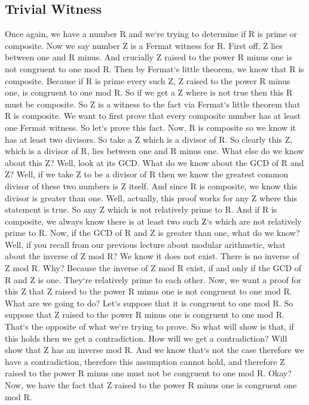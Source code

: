 \subsection{Trivial Witness}
Once again, we have a number R and we`re trying to determine if R is prime or composite.
Now we say number Z is a Fermat witness for R\@.
First off, Z lies between one and R minus.
And crucially Z raised to the power R minus one is not congruent to one mod R\@.
Then by Fermat`s little theorem, we know that R is composite.
Because if R is prime every such Z, Z raised to the power R minus one, is congruent to one mod R\@.
So if we get a Z where is not true then this R must be composite.
So Z is a witness to the fact via Fermat`s little theorem that R is composite.
We want to first prove that every composite number has at least one Fermat witness.
So let`s prove this fact.
Now, R is composite so we know it has at least two divisors.
So take a Z which is a divisor of R\@.
So clearly this Z, which is a divisor of R, lies between one and R minus one.
What else do we know about this Z? Well, look at its GCD\@.
What do we know about the GCD of R and Z? Well, if we take Z to be a divisor of R then we know the greatest common divisor of these two numbers is Z itself.
And since R is composite, we know this divisor is greater than one.
Well, actually, this proof works for any Z where this statement is true.
So any Z which is not relatively prime to R\@.
And if R is composite, we always know there is at least two such Z`s which are not relatively prime to R\@.
Now, if the GCD of R and Z is greater than one, what do we know? Well, if you recall from our previous lecture about modular arithmetic, what about the inverse of Z mod R? We know it does not exist.
There is no inverse of Z mod R\@.
Why? Because the inverse of Z mod R exist, if and only if the GCD of R and Z is one.
They`re relatively prime to each other.
Now, we want a proof for this Z that Z raised to the power R minus one is not congruent to one mod R\@.
What are we going to do? Let`s suppose that it is congruent to one mod R\@.
So suppose that Z raised to the power R minus one is congruent to one mod R\@.
That`s the opposite of what we`re trying to prove.
So what will show is that, if this holds then we get a contradiction.
How will we get a contradiction? Will show that Z has an inverse mod R\@.
And we know that`s not the case therefore we have a contradiction, therefore this assumption cannot hold, and therefore Z raised to the power R minus one must not be congruent to one mod R\@.
Okay? Now, we have the fact that Z raised to the power R minus one is congruent one mod R\@.
